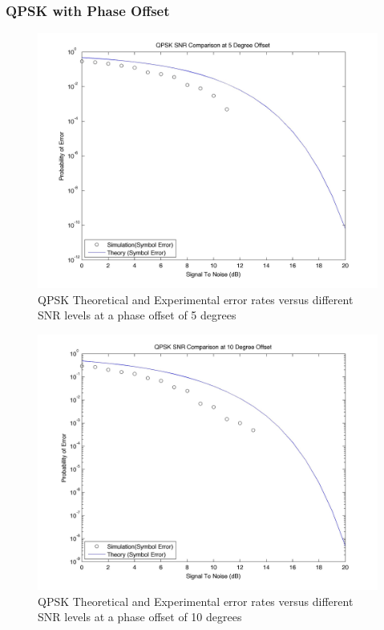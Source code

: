 \documentclass[]{article}
\begin{document}
\subsubsection{QPSK with Phase Offset}
\label{sec:qpsk_phase}
\begin{figure}[H]
\centering
\hspace*{-2cm}\includegraphics[width=1.3\textwidth]{qpSNRpo1.jpg}
\caption{QPSK Theoretical and Experimental error rates versus different SNR levels at a phase offset of 5 degrees }
\end{figure}

\begin{figure}[H]
\centering
\hspace*{-2cm}\includegraphics[width=1.3\textwidth]{qpSNRpo2.jpg}
\caption{QPSK Theoretical and Experimental error rates versus different SNR levels at a phase offset of 10 degrees }
\end{figure}
\end{document}
